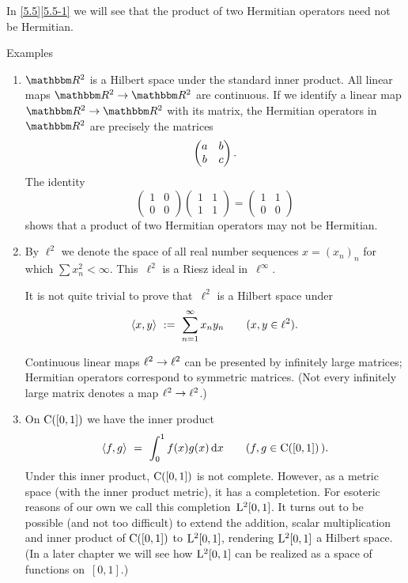 \documentclass[main.tex]{subfiles}
\begin{document}
In \ref{5.5}\ref{5.5-1} we will see
that the product of two Hermitian operators
need not be Hermitian.
%
%
\begin{psec}{5.5}{Examples}
\begin{enumerate}
\item \label{5.5-1}
$\R^2$ is a Hilbert space under the standard inner product.
All linear maps $\R^2\ra\R^2$ are continuous.
If we identify a linear map $\R^2\ra\R^2$ with its matrix,
the Hermitian operators in~$\R^2$ are precisely the matrices
\begin{equation*}
\begin{pmatrix}
a & b \\
b & c 
\end{pmatrix}\text{.}
\end{equation*}
The identity
\begin{equation*}
\begin{pmatrix} 1 & 0 \\ 0 & 0 \end{pmatrix}
\begin{pmatrix} 1 & 1 \\ 1 & 1 \end{pmatrix}
=
\begin{pmatrix} 1 & 1 \\ 0 & 0 \end{pmatrix}
\end{equation*}
shows that a product of two Hermitian operators
may not be Hermitian.
%
\item \label{5.5-2}
By $\ell^2$ we denote the space of all real number sequences
$x=(x_n)_n$ for which $\sum x_n^2<\infty$.
This~$\ell^2$ is a Riesz ideal in~$\ell^\infty$.

It is not quite trivial to prove that~$\ell^2$
is a Hilbert space under
\begin{equation*}
\left<x,y\right>\ :=\ \sum_{n=1}^\infty x_n y_n \qquad (x,y\in\ell^2)\text{.}
\end{equation*}

Continuous linear maps $\ell^2\rightarrow\ell^2$
can be presented by infinitely large matrices;
Hermitian operators correspond to symmetric matrices.
(Not every infinitely large matrix denotes a map $\ell^2\rightarrow\ell^2$.)
%
\item \label{5.5-3}
On $\mathrm{C}([0,1])$ we have the inner product
\begin{equation*}
\left< f,g\right>\ = \ \int_0^1 f(x)g(x)\,\mathrm{d}x
\qquad(f,g\in\mathrm{C}([0,1])\,)\text{.}
\end{equation*}
Under this inner product,
$\mathrm{C}([0,1])$ is not complete.
However,
as a metric space
(with the inner product metric),
it has a completetion.
For esoteric reasons of our own
we call this completion~$\mathrm{L}^2[0,1]$.
It turns out to be possible (and not too difficult)
to extend the addition, scalar multiplication and inner product
of $\mathrm{C}([0,1])$ to $\mathrm{L}^2[0,1]$,
rendering $\mathrm{L}^2[0,1]$ a Hilbert space.
(In a later chapter we will see how $\mathrm{L}^2[0,1]$
can be realized as a space of functions on~$[0,1]$.)


\end{enumerate}
\end{psec}
\end{document}
